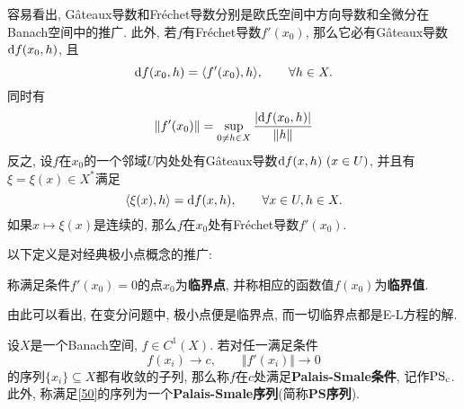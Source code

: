 容易看出, G\^ateaux导数和Fr\'echet导数分别是欧氏空间中方向导数和全微分在Banach空间中的推广.
此外, 若$f$有Fr\'echet导数$f'(x_0)$, 那么它必有G\^ateaux导数${\rm d}f(x_0, h)$, 且 
\begin{equation*}
    {\rm d}f(x_0, h) = \langle f'(x_0), h\rangle, \qquad \forall h \in X.
\end{equation*}
同时有
\begin{equation*}
    \Vert f'(x_0) \Vert = \sup_{0 \neq h \in X}\frac{|{\rm d}f(x_0, h)|}{\Vert h \Vert}
\end{equation*}
反之, 设$f$在$x_0$的一个邻域$U$内处处有G\^ateaux导数${\rm d}f(x, h)\ (x \in U)$, 并且有$\xi = \xi(x) \in X^*$满足 
\begin{equation*}
    \langle \xi(x), h\rangle = {\rm d}f(x, h), \qquad \forall x \in U, h \in X.
\end{equation*}
如果$x \mapsto \xi(x)$是连续的, 那么$f$在$x_0$处有Fr\'echet导数$f'(x_0)$.

以下定义是对经典极小点概念的推广:

\begin{definition}
    称满足条件$f'(x_0) = 0$的点$x_0$为\textbf{临界点}, 并称相应的函数值$f(x_0)$为\textbf{临界值}.
\end{definition}

由此可以看出, 在变分问题中, 极小点便是临界点, 而一切临界点都是E-L方程的解.

\begin{definition}
    设$X$是一个Banach空间, $f \in C^1(X)$. 若对任一满足条件 
    \begin{equation}\label{50}
        f(x_i) \rightarrow c, \qquad \Vert f'(x_i)\Vert \rightarrow 0
    \end{equation}
    的序列$\{x_i\} \subseteq X$都有收敛的子列, 那么称$f$在$c$处满足\textbf{Palais-Smale条件}, 记作${\rm PS_c}$.
    此外, 称满足\eqref{50}的序列为一个\textbf{Palais-Smale序列}(简称\textbf{PS序列}).
\end{definition}

